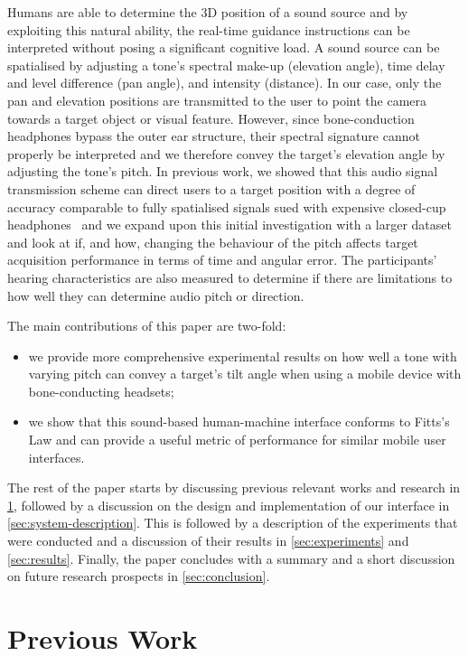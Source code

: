 \documentclass[]{interact}
\begin{document}
Humans are able to determine the 3D position of a sound source and by exploiting this natural ability, the real-time guidance instructions can be interpreted without posing a significant cognitive load.
A sound source can be spatialised by adjusting a tone's spectral make-up (elevation angle), time delay and level difference (pan angle), and intensity (distance).
In our case, only the pan and elevation positions are transmitted to the user to point the camera towards a target object or visual feature.
However, since bone-conduction headphones bypass the outer ear structure, their spectral signature cannot properly be interpreted and we therefore convey the target's elevation angle by adjusting the tone's pitch.
In previous work, we showed that this audio signal transmission scheme can direct users to a target position with a degree of accuracy comparable to fully spatialised signals sued with expensive closed-cup headphones~\citep{lock2019bone,macdonald2006spatial} and we expand upon this initial investigation with a larger dataset and look at if, and how, changing the behaviour of the pitch affects target acquisition performance in terms of time and angular error. 
The participants' hearing characteristics are also measured to determine if there are limitations to how well they can determine audio pitch or direction. 

The main contributions of this paper are two-fold: 

\begin{itemize}
  \item we provide more comprehensive experimental results on how well a tone with varying pitch can convey a target's tilt angle when using a mobile device with bone-conducting headsets; 
  \item we show that this sound-based human-machine interface conforms to Fitts's Law and can provide a useful metric of performance for similar mobile user interfaces.
\end{itemize}

The rest of the paper starts by discussing previous relevant works and research in \cref{sec:prev-work}, followed by a discussion on the design and implementation of our interface in \cref{sec:system-description}.
This is followed by a description of the experiments that were conducted and a discussion of their results in \cref{sec:experiments} and \cref{sec:results}.
Finally, the paper concludes with a summary and a short discussion on future research prospects in \cref{sec:conclusion}.

\section{Previous Work}\label{sec:prev-work}
\end{document}
